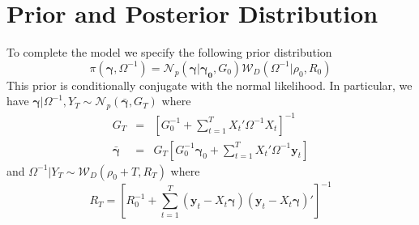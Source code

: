 \documentclass[12pt]{article}
\begin{document}
\section{Prior and Posterior Distribution}
To complete the model we specify the following prior distribution
\begin{equation*}
  \pi (\boldsymbol{\gamma},\Omega^{-1})=\mathcal{N}_{p}\left( \boldsymbol{\gamma} |\boldsymbol{\gamma_{0}},G_{0}\right)
\mathcal{W}_{D}\left(\Omega ^{-1}|\rho_{0}, R_{0}\right)
\end{equation*}
This prior is conditionally conjugate with the normal likelihood.
In particular, we have 
$\boldsymbol{\gamma}|\Omega^{-1},Y_T \sim \mathcal{N}_p\left( \bar{\boldsymbol{\gamma}},G_T \right)$
where
\begin{eqnarray*}
  G_T &=& \left[ G_0^{-1} + \sum_{t=1}^T X_t' \Omega^{-1} X_t \right]^{-1}\\
  \bar{\boldsymbol{\gamma}} &=& G_T \left[ G_0^{-1}\boldsymbol{\gamma}_0 + \sum_{t=1}^{T} X_t'\Omega^{-1}\mathbf{y}_t \right]
\end{eqnarray*}
and
$\Omega^{-1}|Y_T \sim \mathcal{W}_D\left(\rho_0 + T, R_T \right)$
where
\begin{equation*}
  R_T = \left[ R_0^{-1} + \sum_{t=1}^{T} \left( \mathbf{y}_t - X_t \boldsymbol{\gamma} \right)\left( \mathbf{y}_t - X_t \boldsymbol{\gamma} \right)' \right]^{-1}
\end{equation*}
\end{document}
